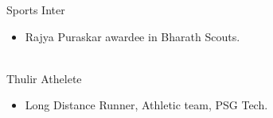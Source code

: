 \documentclass[letterpaper]{Baseclass}
\begin{document}
\begin{envvar} 
	\envvaritem
	{Sports}
	{}
	{\hspace{0.3cm}Inter}
	{}
	{}
	{
		{\begin{itemize}
				\item Rajya Puraskar awardee in Bharath Scouts.
		\end{itemize}}
	}
	\\
	\envvaritem
	{Thulir}
	{}
	{\hspace{0.3cm}Athelete}
	{}
	{}
	{
		{\begin{itemize}
				\item Long Distance Runner, Athletic team, PSG Tech.
		\end{itemize}}
	}
	\\

\end{envvar}
\end{document}
